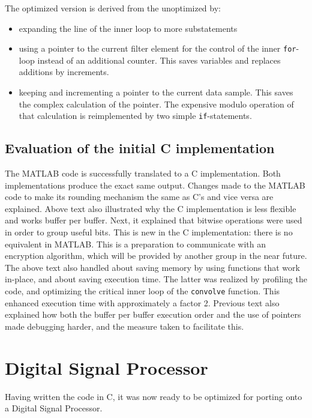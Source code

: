 \documentclass[a4paper]{article}
\begin{document}
\begin{minipage}{\textwidth}
The optimized version is derived from the unoptimized by:
\begin{itemize}
\item expanding the line of the inner loop to more substatements
\item using a pointer to the current filter element for the control of the inner \texttt{for}-loop instead of an additional counter. This saves variables and replaces additions by increments.
\item keeping and incrementing a pointer to the current data sample. This saves the complex calculation of the pointer. The expensive modulo operation of that calculation is reimplemented by two simple \texttt{if}-statements.
\end{itemize}
\end{minipage}

\subsection{Evaluation of the initial C implementation}
The MATLAB code is successfully translated to a C implementation. Both implementations produce the exact same output. Changes made to the MATLAB code to make its rounding mechanism the same as C's and vice versa are explained. Above text also illustrated why the C implementation is less flexible and works buffer per buffer. Next, it explained that bitwise operations were used in order to group useful bits. This is new in the C implementation: there is no equivalent in MATLAB. This is a preparation to communicate with an encryption algorithm, which will be provided by another group in the near future. The above text also handled about saving memory by using functions that work in-place, and about saving execution time. The latter was realized by profiling the code, and optimizing the critical inner loop of the \texttt{convolve} function. This enhanced execution time with approximately a factor 2. Previous text also explained how both the buffer per buffer execution order and the use of pointers made debugging harder, and the measure taken to facilitate this.

\section{Digital Signal Processor}
Having written the code in C, it was now ready to be optimized for porting onto a Digital Signal Processor.
\end{document}
